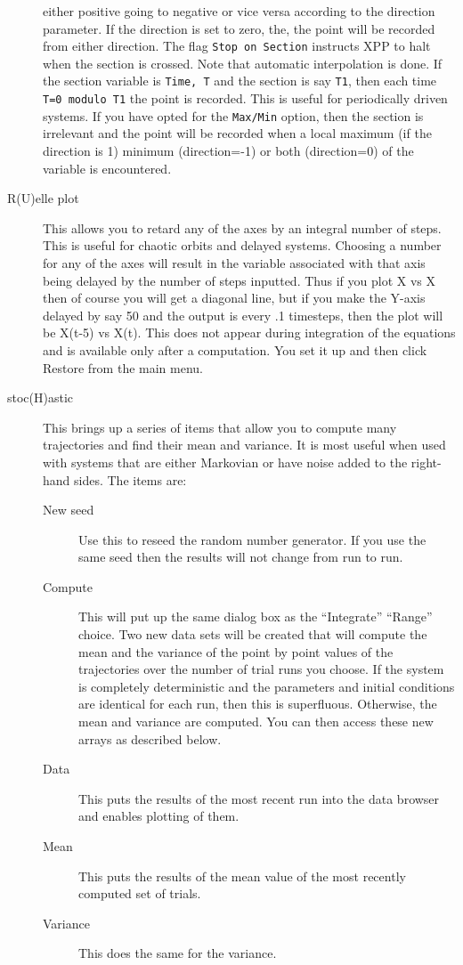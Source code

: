 \begin{description}
either positive going to negative or vice versa according to the direction
 parameter.  If the direction is set to zero, the, the point will be recorded
 from either direction.  The flag {\tt Stop on Section} instructs XPP to halt when
 the section is crossed.  Note that automatic interpolation is done.  If the 
section variable is {\tt Time, T} and the section is say {\tt T1},
then 
each time {\tt T=0 modulo T1} the point is recorded. 
 This is useful for periodically driven 
systems.  If you have opted for the {\tt Max/Min} option, then the section is 
irrelevant and the point will be recorded when a local maximum (if the 
direction is 1) minimum (direction=-1) or both (direction=0) of the variable
 is encountered.
\item[R(U)elle plot]  This allows you to retard any of the axes by an integral
 number of steps.  This is useful for chaotic orbits and delayed systems. 
 Choosing a number for any of the axes will result in the variable associated
 with that axis being delayed by the number of steps inputted.  Thus if you
 plot X vs X then of course you will get a diagonal line, but if you make the 
Y-axis delayed by say 50 and the output is every .1 timesteps, then the plot 
will be X(t-5) vs X(t). This does not appear during integration of the equations
 and is available only after a computation.  You set it up and then click 
Restore from the main menu.
\item[stoc(H)astic]  This brings up a series of items that allow you
to compute many trajectories and find their mean and variance.  It is
most useful when used with systems that are either Markovian or have
noise added to the right-hand sides.  The items are:
\begin{description}
	\item[New seed]  Use this to reseed the random number
generator.  If you use the same seed then the results will not change
from run to run.
	\item[Compute] This will put up the same dialog box as the
``Integrate'' ``Range'' choice.  Two new data sets will be created
that will compute the mean and the variance of the point by point
values of the trajectories over the number of trial runs you choose.
If the system is completely deterministic and the parameters and
initial conditions are identical for each run, then this is
superfluous.  Otherwise, the mean and variance are computed.  You can
then access these new arrays as described below.
	\item[Data] This puts the results of the most recent run into
the data browser and enables plotting of them.
	\item[Mean] This puts the results of the mean value of the
most recently computed set of trials.
	\item[Variance] This does the same for the variance.
\end{description}
	

\end{description}
